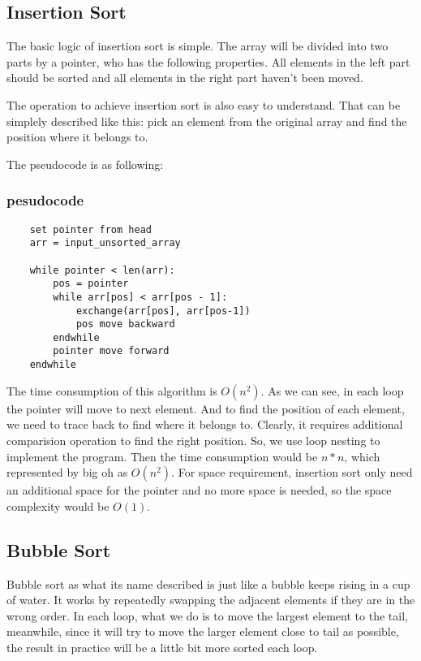 \documentclass[12pt]{article}
\begin{document}
\subsection{Insertion Sort}
The basic logic of insertion sort is simple. The array will be divided into two parts by a 
pointer, who has the following properties. All elements in the left part should be sorted 
and all elements in the right part haven't been moved. 

The operation to achieve insertion sort is also easy to understand. That can be simplely 
described like this:
pick an element from the original array and find the position where it belongs to. 

The pseudocode is as following:

\subsubsection*{pesudocode}

\begin{verbatim}
    set pointer from head
    arr = input_unsorted_array

    while pointer < len(arr):
        pos = pointer
        while arr[pos] < arr[pos - 1]:
            exchange(arr[pos], arr[pos-1])
            pos move backward
        endwhile
        pointer move forward
    endwhile

\end{verbatim}

The time consumption of this algorithm is $O(n^2)$. As we can see, in each loop the pointer 
will move to next element. And to find the position of each element, we need to trace back to 
find where it belongs to. Clearly, it requires additional comparision operation to find the 
right position. So, we use loop nesting to implement the program. Then the time consumption 
would be $n*n$, which represented by big oh as $O(n^2)$.
For space requirement, insertion sort only need an additional space for the pointer and no more 
space is needed, so the space complexity would be $O(1)$.

\subsection{Bubble Sort}

Bubble sort as what its name described is just like a bubble keeps rising in a cup of water. It works by repeatedly swapping the adjacent elements if they are in the wrong order. In each loop, what we do is to move the largest element to the tail, meanwhile, since it will try to move the larger element close to tail as possible, the result in practice will be a little bit more sorted each loop.
\end{document}
